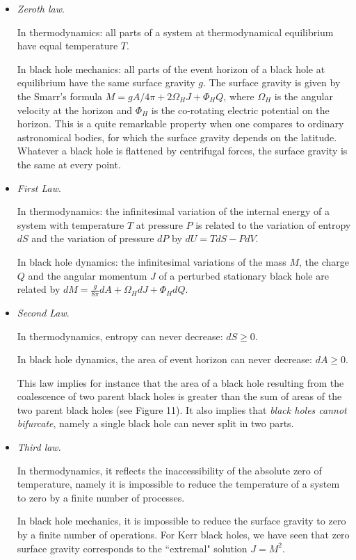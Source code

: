 \documentclass[12pt]{article}
\begin{document}
\begin{itemize}
\item {\it Zeroth law}.

In thermodynamics: all parts of a system at thermodynamical equilibrium have
equal temperature $T$.

In black hole mechanics: all parts of the event horizon of a black hole at
equilibrium have the same surface gravity $g$. The
surface gravity is given by the Smarr's formula $M = gA/4\pi + 2
\Omega_HJ + \Phi_H Q$, where  $\Omega_H$ is the angular velocity at the
horizon and  $\Phi_H$ is the co-rotating electric potential on the horizon.
This is a quite remarkable property when one compares to ordinary astronomical
bodies, for which the surface gravity depends on the latitude. Whatever a black
hole is flattened by centrifugal forces, the surface gravity is the same at
every point.
\item {\it First Law}.

In thermodynamics: the infinitesimal variation of the internal energy of a
system with temperature $T$ at pressure $P$ is related to the 
variation of entropy $dS$ and the variation of pressure $dP$ by
$dU = T dS - PdV$.

In black hole dynamics: the infinitesimal variations of the mass $M$, the charge
$Q$ and the angular momentum $J$ of a perturbed stationary black hole are
related by $dM = \frac{g}{8\pi}dA + \Omega_H dJ +\Phi_H dQ$.   
 
\item {\it Second Law}.

In thermodynamics, entropy can never decrease: $dS \ge 0$.

In black hole dynamics, the area of event horizon can never decrease: $dA
\ge 0$.

This law implies for instance that the area of a black hole resulting from
the coalescence of two parent black holes is greater than the sum of areas of
the two parent black holes (see Figure 11). It also implies that {\it black holes
cannot bifurcate}, namely a single black hole can never split in two parts. 

\item {\it Third law}.

In thermodynamics, it reflects the inaccessibility of the absolute zero of
temperature, namely it is impossible to reduce the temperature of a system to
zero by a finite number of processes.
  
In black hole mechanics, it is impossible to reduce the surface
gravity to zero by a finite number of operations. For Kerr black
holes, we have seen that zero surface gravity corresponds to the
 ``extremal" solution $J=M^2$.
\end{itemize}
 
\end{document}
